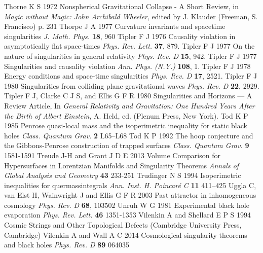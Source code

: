 \documentclass[12pt]{iopart}
\begin{document}
\begin{thebibliography}{999}
 Thorne K S 1972 Nonspherical Gravitational Collapse - A Short Review, in {\it Magic without Magic: John Archibald Wheeler}, edited by J. Klauder (Freeman, S. Francisco) p. 231%
 Thorpe J A 1977 Curvature invariants and spacetime singularities {\it J. Math. Phys.} {\bf 18},
960 %
 Tipler F J 1976 Causality violation in asymptotically flat space-times {\it Phys. Rev. Lett.} {\bf 37},
879.%
 Tipler F J 1977 On the nature of singularities in general relativity {\it Phys. Rev.  D} {\bf 15},
942.%
 Tipler F J 1977 Singularities and causality violation {\it Ann. Phys. (N.Y.)}  {\bf 108}, 1.%
 Tipler F J 1978 Energy conditions and space-time singularities {\it Phys. Rev. D} {\bf 17},
2521.%
 Tipler F J 1980 Singularities from colliding plane gravitational waves {\it Phys. Rev. D} {\bf 22},
2929.%
 Tipler F J, Clarke C J S, and Ellis G F R 1980 Singularities 
and Horizons --- A Review Article, 
In {\it General Relativity and Gravitation: One Hundred Years After the Birth
of Albert Einstein}, A. Held, ed. (Plenum Press, New York).
 Tod K P 1985 Penrose quasi-local mass and the isoperimetric inequality for static black holes {\it Class. Quantum Grav.} {\bf 2} L65--L68
 Tod K P 1992 The hoop conjecture and the Gibbons-Penrose construction of trapped surfaces {\it Class. Quantum Grav.} {\bf 9} 1581-1591
 Treude J-H and Grant J D E 2013 Volume Comparison for Hypersurfaces in Lorentzian Manifolds and Singularity Theorems {\it Annals of Global Analysis and Geometry} {\bf 43} 233-251%
 Trudinger N S 1994 Isoperimetric inequalities for quermassintegrals {\it Ann. Inst. H. Poincar\'e C } {\bf 11}  411--425
 Uggla C, van Elst H, Wainwright J and Ellis G F R 2003 Past attractor in inhomogeneous cosmology {\it Phys. Rev. D} {\bf 68}, 103502
 Unruh W G 1981 Experimental black hole evaporation {\it Phys. Rev. Lett.} {\bf 46} 1351-1353
 Vilenkin A and Shellard E P S 1994 Cosmic Strings and Other Topological
Defects (Cambridge University Press, Cambridge)
 Vilenkin A and Wall A C 2014 Cosmological singularity theorems and black holes {\it Phys. Rev. D} {\bf 89} 064035

\end{thebibliography}
\end{document}
